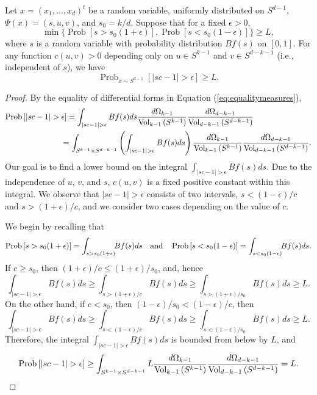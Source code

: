 \documentclass[twoside,11pt]{article}
\newcommand{\pP}[1]{\operatorname{Prob}\left[ #1 \right] }
\newcommand{\pPP}[2]{\operatorname{Prob}_{#2} \left[ #1 \right] }
\newcommand{\VV}[2]{\text{Vol}_{#2}\left( #1 \right)}
\begin{document}
\begin{lemma} \label{lemma_c}
Let $x =(x_1, \ldots, x_d)^t$ be a random variable, uniformly distributed on $S^{d-1}$, $\Psi(x)=(s,u,v)$, and $s_0=k/d$.
Suppose that for a fixed $\epsilon>0$,
\[   \min\{ \pP{s>s_0(1+\epsilon)}, \pP{s<s_0(1-\epsilon)}\} \geq L,\]
where $s$ is a random variable with probability distribution $Bf(s)$ on $[0,1]$.
For any function  $c(u,v)>0$ depending  only on $u \in S^{k-1}$ and $v \in S^{d-k-1}$ (i.e., independent of $s$), we have
\[
\pPP{|s c -1| > \epsilon}{x\sim S^{d-1}}  \geq   L.
\]
\end{lemma}
\begin{proof}
By the equality of differential forms in Equation (\ref{eq:equalitymeasures}), 
\begin{align*}
\mbox{Prob}\left[ |sc -1| > \epsilon \right]   & =  \int_{|s c -1| > \epsilon} Bf(s) ds  \frac{d\Omega_{k-1}}{\VV{S^{k-1}}{k-1}} \frac{d\Omega_{d-k-1}}{\VV{S^{d-k-1}}{d-k-1}}\\
				 &\hspace{-.1in}=  \int_{S^{k-1}\times S^{d-k-1}} \left( \int_{|s c -1| > \epsilon} Bf(s) ds \right)  \frac{d\Omega_{k-1}}{\VV{S^{k-1}}{k-1}} \frac{d\Omega_{d-k-1}}{\VV{S^{d-k-1}}{d-k-1}}.
\end{align*}
Our goal is to find a lower bound on the integral $\int_{|s c -1| > \epsilon} Bf(s) ds$.  Due to the independence of $u$, $v$, and $s$, $c(u,v)$ is a fixed positive constant within this integral.  We observe that $|sc-1|>\epsilon$ consists of two intervals, $s<(1-\epsilon)/c$ and $s>(1+\epsilon)/c$, and we consider two cases depending on the value of $c$.

We begin by recalling that
$$\pP{s>s_0 (1+\epsilon)}  =  \int_{s>s_0 (1+\epsilon)} \hspace{-.05in}B f(s)ds\quad\text{and}\quad\pP{s<s_0 (1-\epsilon)}   =   \int_{s<s_0(1-\epsilon)} \hspace{-.05in}Bf(s)ds.$$
If  $c \geq  s_0$, then   $(1+\epsilon)/c \leq  (1+\epsilon)/s_0$, and, hence
\[  \int_{|s c -1| > \epsilon} Bf(s) ds  \geq \int_{s > (1+ \epsilon)/c} Bf(s) ds \geq \int_{s > (1+ \epsilon)/s_0} Bf(s) ds \geq L.\]
On the other hand, if  $c < s_0$, then  $(1-\epsilon)/s_0 < (1-\epsilon)/c$, then
\[  \int_{|s c -1| > \epsilon} Bf(s) ds  \geq \int_{s < (1- \epsilon)/c} Bf(s) ds \geq \int_{s < (1- \epsilon)/s_0} Bf(s) ds \geq L.\]
Therefore, the integral $\int_{|s c -1| > \epsilon} Bf(s) ds$ is bounded from below by $L$, and 
\[  \pP{|sc -1| > \epsilon}     \geq   
\int_{S^{k-1}\times S^{d-k-1}} L    \frac{d\Omega_{k-1}}{\VV{S^{k-1}}{k-1}} \frac{d\Omega_{d-k-1}}{\VV{S^{d-k-1}}{d-k-1}}  =  L.\vspace{-.37in}\]
\end{proof}
\vspace{.12in}
\end{document}
